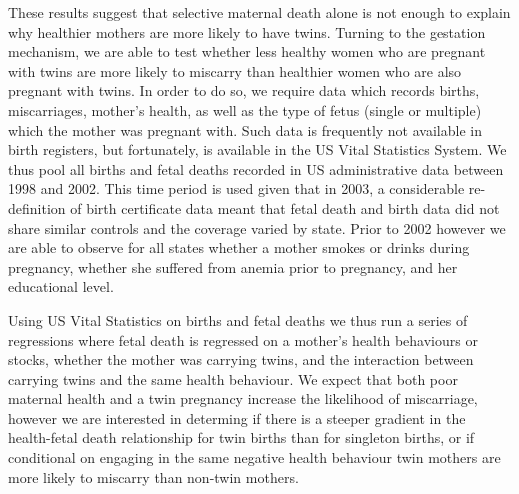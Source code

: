 \documentclass[subeqn]{article}
\begin{document}
\begin{spacing}{1.4}
These results suggest that selective maternal death alone is not enough to 
explain why healthier mothers are more likely to have twins. Turning to the 
gestation mechanism, we are able to test whether less healthy women who are 
pregnant with twins are more likely to miscarry than healthier women who are 
also pregnant with twins.  In order to do so, we require data which records
births, miscarriages, mother's health, as well as the type of fetus (single
or multiple) which the mother was pregnant with.  Such data is frequently not
available in birth registers, but fortunately, is available in the US Vital
Statistics System.  We thus pool all births and fetal deaths recorded in US
administrative data between 1998 and 2002.  This time period is used given
that in 2003, a considerable re-definition of birth certificate data meant
that fetal death and birth data did not share similar controls and the coverage
varied by state.  Prior to 2002 however we are able to observe for all states
whether a mother smokes or drinks during pregnancy, whether she suffered from
anemia prior to pregnancy, and her educational level.

Using US Vital Statistics on births and fetal deaths we thus run a series of
regressions where fetal death is regressed on a mother's health behaviours or
stocks, whether the mother was carrying twins, and the interaction between
carrying twins and the same health behaviour.  We expect that both poor
maternal health and a twin pregnancy increase the likelihood of miscarriage,
however we are interested in determing if there is a steeper gradient in the
health-fetal death relationship for twin births than for singleton births, or
if conditional on engaging in the same negative health behaviour twin mothers
are more likely to miscarry than non-twin mothers.


\end{spacing}
\end{document}
